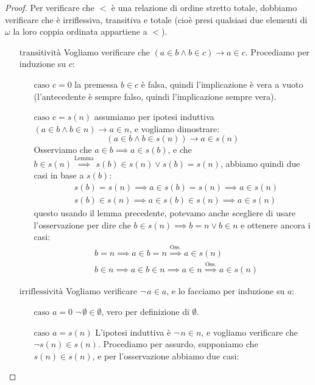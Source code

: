\begin{proof}
	Per verificare che $<$ è una relazione di ordine stretto totale, dobbiamo verificare che è irriflessiva, transitiva e totale (cioè presi qualsiasi due elementi di $\omega$ la loro coppia ordinata appartiene a $<$).
	\begin{itemize}
		\item[$\boxed{\text{transitività}}$] Vogliamo verificare che $(a \in b \land b \in c) \rightarrow a \in c$. Procediamo per induzione su $c$:
		\begin{itemize}
			\item[$\boxed{\text{caso $c = 0$}}$] la premessa $b \in c$ è falsa, quindi l'implicazione è vera a vuoto (l'antecedente è sempre falso, quindi l'implicazione sempre vera).
			\item[$\boxed{\text{caso $c = s(n)$}}$] assumiamo per ipotesi induttiva $(a \in b \land b \in n) \rightarrow a \in n$, e vogliamo dimostrare:
				\[ (a \in b \land b \in s(n)) \rightarrow a \in s(n)
					\]
				Osserviamo che $a \in b \implies a \in s(b)$, e che $b \in s(n) \overset{\text{Lemma}}{\implies} s(b) \in s(n) \lor s(b) = s(n)$, abbiamo quindi due casi in base a $s(b)$:
				\[ \begin{split}
					& s(b) = s(n) \implies a \in s(b) = s(n) \implies a \in s(n)\\
					& s(b) \in s(n) \implies a \in s(b) \in s(n) \implies a \in s(n)
				\end{split}
					\]
				questo usando il lemma precedente, potevamo anche scegliere di usare l'osservazione per dire che $b \in s(n) \implies b = n \lor b \in n$ e ottenere ancora i casi:
				\[  \begin{split}
					& b = n \implies a \in b = n \overset{\text{Oss.}}{\implies} a \in s(n) \\
					& b \in n \implies a \in b \in n \implies a \in n \overset{\text{Oss.}}{\implies} a \in s(n)
					\end{split}
					\]
		\end{itemize}
		\item[$\boxed{\text{irriflessività}}$] Vogliamo verificare $\neg \,a \in a$, e lo facciamo per induzione su $a$:
		\begin{itemize}
			\item[$\boxed{\text{caso $a = 0$}}$] $\neg \, \emptyset \in \emptyset$, vero per definizione di $\emptyset$.
			\item[$\boxed{\text{caso $a = s(n)$}}$] L'ipotesi induttiva è $\neg \, n \in n$, e vogliamo verificare che $\neg s(n) \in s(n)$. Procediamo per assurdo, supponiamo che $s(n) \in s(n)$, e per l'osservazione abbiamo due casi:

\end{itemize}
\end{itemize}
\end{proof}
